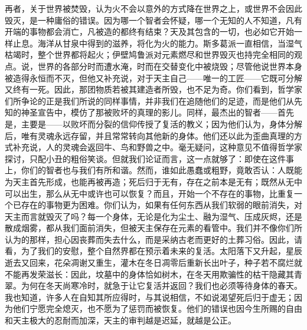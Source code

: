 再者，关于世界被焚毁，认为火不会以意外的方式降在世界之上，或世界不会因此毁灭，是一种庸俗的错误。因为哪一个智者会怀疑，哪一个无知的人不知道，凡有开端的事物都会消亡，凡被造的都终有结束？天及其包含的一切，也必如它开始一样止息。海洋从甘泉中得到的滋养，将化为火的能力。斯多葛派一直相信，当湿气枯竭时，整个世界都将起火；伊壁鸠鲁派对元素燃尽和世界毁灭也持完全相同的观点。说，世界的各部分时而遭水淹，时而在交替变化中被烧毁；尽管他说世界本身被造得永恒而不灭，但他又补充说，对于天主自己——唯一的工匠——它既可分解又终有一死。因此，那团物质若被其建造者所毁，也不足为奇。你们看到，哲学家们所争论的正是我们所说的同样事情，并非我们在追随他们的足迹，而是他们从先知的神圣宣告中，模仿了那被败坏的真理的影儿。同样，最杰出的智者——首先是，主要是——以败坏而分裂的信仰传授了复活的教义；因为他们认为，身体分解后，唯有灵魂永远存留，并且常常转向其他新的身体。他们还以此为歪曲真理的方式补充说，人的灵魂会返回牛、鸟和野兽之中。毫无疑问，这种意见不值得哲学家探讨，只配小丑的粗俗笑谈。但就我们论证而言，这一点就够了：即使在这件事上，你们的智者也与我们有所和谐。然而，谁如此愚蠢或粗野，竟敢否认：人既能为天主首先形成，也能再被再造；死后归于无有，存在之前本是无有；既然从无中可以出生，那么从无中或许也可以恢复？而且，开始一个不存在的事物，比重复一个已存在的事物更为困难。你们认为，如果有任何东西从我们软弱的眼前消失，对天主而言就毁灭了吗？每一个身体，无论是化为尘土、融为湿气、压成灰烬，还是散成烟雾，都从我们面前消失，但被天主保存在元素的看管中。我们并不像你们所认为的那样，担心因丧葬而失去什么，而是采纳古老而更好的土葬习俗。因此，请看，为了我们的安慰，整个自然界都在预示着未来的复活。太阳落下又升起，星辰逝去又回来，花朵凋谢又重生，灌木在冬日凋零后重新长出叶子，种子若不腐烂就不能再发荣滋长：因此，坟墓中的身体恰如树木，在冬天用欺骗性的枯干隐藏其青翠。为何在冬天尚寒冷时，就急于让它复活并返回？我们也必须等待身体的春天。我也知道，许多人在自知其所应得时，与其说相信，不如说渴望死后归于虚无；因为他们宁愿完全熄灭，也不愿为了惩罚而被恢复。他们的错误也因今生所赐的自由和天主极大的忍耐而加深，天主的审判越是迟延，就越是公正。\par

\par

